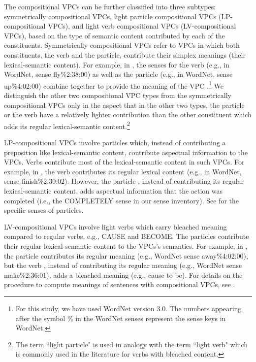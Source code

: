 \documentclass[output=paper,modfonts,nonflat]{langsci/langscibook}
\begin{document}
The compositional VPCs can be further classified into three subtypes: symmetrically compositional VPCs, light particle compositional VPCs (LP-compositional VPCs), and light verb compositional VPCs (LV-compositional VPCs), based on the type of semantic content contributed by each of the constituents. Symmetrically compositional VPCs refer to VPCs in which both constituents, the verb and the particle, contribute their simplex meanings (their lexical-semantic content). For example, in , the senses for the verb  (e.g., in WordNet, sense fly\%2:38:00) as well as the particle  (e.g., in WordNet, sense up\%4:02:00) combine together to provide the meaning of the VPC .\footnote{For this study, we have used WordNet version 3.0. The numbers appearing after the symbol \% in the WordNet senses represent the sense keys in WordNet.} We distinguish the other two compositional VPC types from the symmetrically compositional VPCs only in the aspect that in the other two types, the particle or the verb have a relatively lighter contribution than the other constituent which adds its regular lexical-semantic content.\footnote{The term ``light particle" is used in analogy with the term ``light verb" which is commonly used in the literature for verbs with bleached content.} 

LP-compositional VPCs involve particles which, instead of contributing a preposition like lexical-semantic content, contribute aspectual information to the VPCs. Verbs contribute most of the lexical-semantic content in such VPCs. For example, in  \citep{Ban03b}, the verb  contributes its regular lexical content (e.g., in WordNet, sense finish\%2:30:02). However, the particle , instead of contributing its regular lexical-semantic content, adds aspectual information that the action was completed (i.e., the COMPLETELY sense in our sense inventory). See  for the specific senses of particles. 

LV-compositional VPCs involve light verbs which carry bleached meaning compared to regular verbs, e.g., CAUSE and BECOME. The particles contribute their regular lexical-semantic content to the VPCs's semantics.  For example, in , the particle  contributes its regular meaning (e.g., WordNet sense away\%4:02:00), but the verb , instead of contributing its regular meaning (e.g., WordNet sense make\%2:36:01), adds a bleached meaning (e.g., cause to be). For details on the procedure to compute meanings of sentences with compositional VPCs, see .
\end{document}

